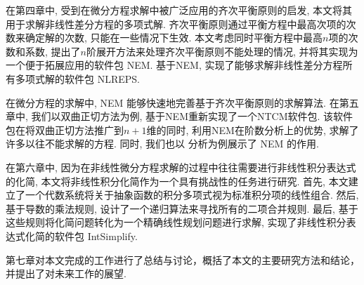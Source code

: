 在第四章中, 受到在微分方程求解中被广泛应用的齐次平衡原则的启发, 本文将其用于求解非线性差分方程的多项式解. 齐次平衡原则通过平衡方程中最高次项的次数来确定解的次数, 只能在一些情况下生效. 本文考虑同时平衡方程中最高$n$项的次数和系数, 提出了$n$阶展开方法来处理齐次平衡原则不能处理的情况, 并将其实现为一个便于拓展应用的软件包 NEM. 基于NEM, 实现了能够求解非线性差分方程所有多项式解的软件包 NLREPS. 

在微分方程的求解中, NEM 能够快速地完善基于齐次平衡原则的求解算法. 在第五章中, 我们以双曲正切方法为例, 基于NEM重新实现了一个NTCM软件包. 该软件包在将双曲正切方法推广到$n+1$维的同时, 利用NEM在阶数分析上的优势, 求解了许多以往不能求解的方程. 同时, 我们也以 \Painleve{} 分析为例展示了 NEM 的作用. 

在第六章中, 因为在非线性微分方程求解的过程中往往需要进行非线性积分表达式的化简, 本文将非线性积分化简作为一个具有挑战性的任务进行研究. 首先, 本文建立了一个代数系统将关于抽象函数的积分多项式视为标准积分项的线性组合. 然后, 基于导数的乘法规则, 设计了一个递归算法来寻找所有的二项合并规则. 最后, 基于这些规则将化简问题转化为一个精确线性规划问题进行求解, 实现了非线性积分表达式化简的软件包 IntSimplify. 

第七章对本文完成的工作进行了总结与讨论，概括了本文的主要研究方法和结论，并提出了对未来工作的展望.
